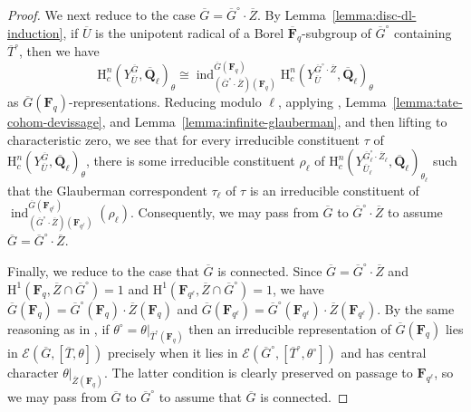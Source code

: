 \documentclass[reqno]{amsart}
\numberwithin{equation}{subsection}
\newcommand{\F}{\mathbf{F}}
\newcommand{\Q}{\mathbf{Q}}
\newcommand{\Gal}{\operatorname{Gal}}
\newcommand{\ol}[1]{\overline{#1}}
\newcommand\cE{\mathcal{E}}
\DeclareMathOperator{\ind}{ind}
\newcommand{\rH}{\ensuremath{\mathrm{H}}\xspace}
\theoremstyle{remark}
\numberwithin{equation}{subsection}
\numberwithin{figure}{subsection}
\begin{document}
\begin{proof}
    We next reduce to the case $\ol G = \ol G^\circ \cdot \ol Z$. By Lemma~\ref{lemma:disc-dl-induction}, if $\ol U$ is the unipotent radical of a Borel $\ol\F_q$-subgroup of $\ol G^\circ$ containing $\ol T^\circ$, then we have 
    \[
    \rH_c^n(Y_{\ol U}^{\ol G}, \ol\Q_\ell)_\theta \cong \ind_{(\ol G^\circ \cdot \ol Z)(\F_q)}^{\ol G(\F_q)} \rH_c^n(Y_{\ol U}^{\ol G^\circ \cdot \ol Z}, \ol\Q_\ell)_\theta
    \]
    as $\ol G(\F_q)$-representations. Reducing modulo $\ell$, applying \cite[Proposition~3.3]{TV}, Lemma~\ref{lemma:tate-cohom-devissage}, and Lemma~\ref{lemma:infinite-glauberman}, and then lifting to characteristic zero, we see that for every irreducible constituent $\tau$ of $\rH_c^n(Y_{\ol U}^{\ol G}, \ol\Q_\ell)_\theta$, there is some irreducible constituent $\rho_\ell$ of $\rH_c^n(Y_{\ol U_\ell}^{\ol G^\circ_\ell \cdot \ol Z_\ell}, \ol\Q_\ell)_{\theta_\ell}$ such that the Glauberman correspondent $\tau_\ell$ of $\tau$ is an irreducible constituent of $\ind_{(\ol G^\circ \cdot \ol Z)(\F_{q^\ell})}^{\ol G(\F_{q^\ell})}(\rho_\ell)$. Consequently, we may pass from $\ol G$ to $\ol G^\circ \cdot \ol Z$ to assume $\ol G = \ol G^\circ \cdot \ol Z$.

    Finally, we reduce to the case that $\ol G$ is connected. Since $\ol G = \ol G^\circ \cdot \ol Z$ and $\rH^1(\F_q, \ol Z \cap \ol G^\circ) = 1$ and $\rH^1(\F_{q^\ell}, \ol Z \cap \ol G^\circ) = 1$, we have $\ol G(\F_q) = \ol G^\circ(\F_q) \cdot \ol Z(\F_q)$ and $\ol G(\F_{q^\ell}) = \ol G^\circ(\F_{q^\ell}) \cdot \ol Z(\F_{q^\ell})$. By the same reasoning as in \cite[Remark 2.6.5]{Kal21b}, if $\theta^\circ = \theta|_{\ol T^\circ(\F_q)}$ then an irreducible representation of $\ol G(\F_q)$ lies in $\cE(\ol G, [\ol T, \theta])$ precisely when it lies in $\cE(\ol G^\circ, [\ol T^\circ, \theta^\circ])$ and has central character $\theta|_{\ol Z(\F_q)}$. The latter condition is clearly preserved on passage to $\F_{q^\ell}$, so we may pass from $\ol G$ to $\ol G^\circ$ to assume that $\ol G$ is connected.



\end{proof}
\end{document}
